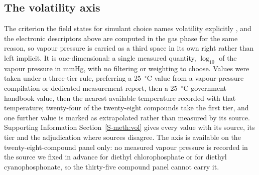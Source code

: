 \documentclass[journal=ancham,manuscript=article,margin=1in]{achemso}
\begin{document}
\subsection{The volatility axis}
\label{meth:vol}
The criterion the field states for simulant choice names volatility explicitly
\cite{webb2025}, and the electronic descriptors above are computed in the gas
phase for the same reason, so vapour pressure is carried as a third space in its
own right rather than left implicit. It is one-dimensional: a single measured
quantity, $\log_{10}$ of the vapour pressure in mmHg, with no filtering or
weighting to choose. Values were taken under a three-tier rule, preferring a
25~$^{\circ}$C value from a vapour-pressure compilation or dedicated measurement
report, then a 25~$^{\circ}$C government-handbook value, then the nearest
available temperature recorded with that temperature; twenty-four of the
twenty-eight compounds take the first tier, and one further value is marked as
extrapolated rather than measured by its source. Supporting Information
Section~\ref{S-meth:vol} gives every value with its source, its tier and the
adjudication where sources disagree. The axis is available on the
twenty-eight-compound panel only: no measured vapour pressure is recorded in
the source we fixed in advance for
diethyl chlorophosphate or for diethyl cyanophosphonate, so the thirty-five
compound panel cannot carry it.
\end{document}
